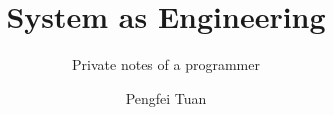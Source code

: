 \documentclass[graybox,envcountchap,sectrefs]{svmono}
\begin{document}
\author{Pengfei Tuan}
\title{System as Engineering}
\subtitle{Private notes of a programmer}
\maketitle

\frontmatter%


%
%
%

\tableofcontents

%


\mainmatter%








%

\backmatter%
%
%
\printindex

\end{document}
